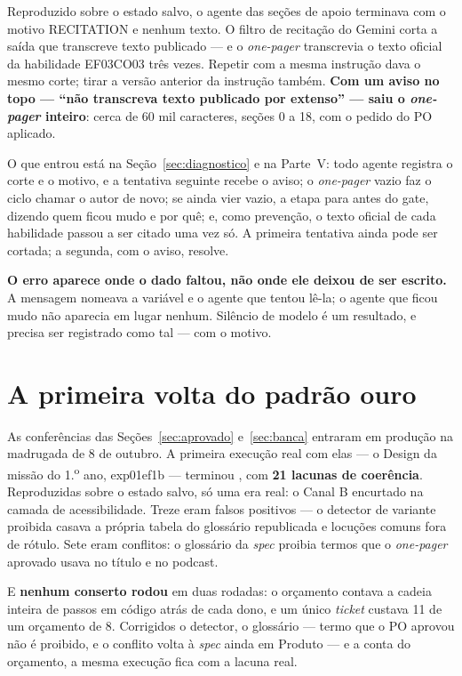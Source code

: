 \documentclass[11pt,a4paper]{article}
\newcommand{\cod}[1]{{\ttfamily\small #1}}
\newcommand{\bolinha}[1]{\tikz[baseline=-0.5ex]{\fill[#1] (0,0) circle (0.33em);}}
\newcommand{\statusVermelho}{\bolinha{sinalVermelho}}
\begin{document}
Reproduzido sobre o estado salvo, o agente das seções de apoio terminava com o motivo \cod{RECITATION} e nenhum texto. O filtro de recitação do Gemini corta a saída que transcreve texto publicado --- e o \emph{one-pager} transcrevia o texto oficial da habilidade EF03CO03 três vezes. Repetir com a mesma instrução dava o mesmo corte; tirar a versão anterior da instrução também. \textbf{Com um aviso no topo --- ``não transcreva texto publicado por extenso'' --- saiu o \emph{one-pager} inteiro}: cerca de 60 mil caracteres, seções 0 a 18, com o pedido do PO aplicado.

O que entrou está na Seção~\ref{sec:diagnostico} e na Parte~V: todo agente registra o corte e o motivo, e a tentativa seguinte recebe o aviso; o \emph{one-pager} vazio faz o ciclo chamar o autor de novo; se ainda vier vazio, a etapa para antes do gate, dizendo quem ficou mudo e por quê; e, como prevenção, o texto oficial de cada habilidade passou a ser citado uma vez só. A primeira tentativa ainda pode ser cortada; a segunda, com o aviso, resolve.

\begin{destaque}
\textbf{O erro aparece onde o dado faltou, não onde ele deixou de ser escrito.} A mensagem nomeava a variável e o agente que tentou lê-la; o agente que ficou mudo não aparecia em lugar nenhum. Silêncio de modelo é um resultado, e precisa ser registrado como tal --- com o motivo.
\end{destaque}

\section{A primeira volta do padrão ouro}

As conferências das Seções~\ref{sec:aprovado} e~\ref{sec:banca} entraram em produção na madrugada de 8 de outubro. A primeira execução real com elas --- o Design da missão do 1.\textsuperscript{o} ano, \cod{exp01ef1b} --- terminou \statusVermelho, com \textbf{21 lacunas de coerência}. Reproduzidas sobre o estado salvo, só uma era real: o Canal B encurtado na camada de acessibilidade. Treze eram falsos positivos --- o detector de variante proibida casava a própria tabela do glossário republicada e locuções comuns fora de rótulo. Sete eram conflitos: o glossário da \emph{spec} proibia termos que o \emph{one-pager} aprovado usava no título e no podcast.

E \textbf{nenhum conserto rodou} em duas rodadas: o orçamento contava a cadeia inteira de passos em código atrás de cada dono, e um único \emph{ticket} custava 11 de um orçamento de 8. Corrigidos o detector, o glossário --- termo que o PO aprovou não é proibido, e o conflito volta à \emph{spec} ainda em Produto --- e a conta do orçamento, a mesma execução fica com a lacuna real.
\end{document}
